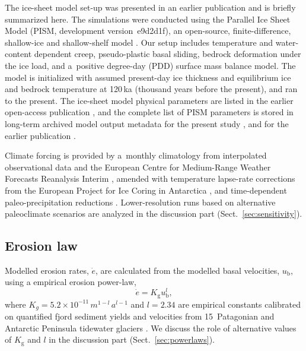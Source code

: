 \documentclass[esurf, manuscript]{copernicus}
\begin{document}
    The ice-sheet model set-up was presented in an earlier publication
    \citep{Seguinot.etal.2018} and is briefly summarized here. The simulations
    were conducted using the Parallel Ice Sheet Model (PISM, development
    version~e9d2d1f), an open-source, finite-difference, shallow-ice and
    shallow-shelf model \citep{PISM-authors.2017}. Our setup includes
    temperature and water-content dependent creep, pseudo-plastic basal
    sliding, bedrock deformation under the ice
    load, and a~positive degree-day (PDD) surface mass balance model. The model
    is initialized with assumed present-day ice thickness and equilibrium
    ice and bedrock temperature at 120\,ka (thousand years before the present),
    and ran to the present. The ice-sheet model physical parameters are listed
    in the earlier open-access publication \citep{Seguinot.etal.2018}, and the
    complete list of PISM
    parameters is stored in long-term archived model output metadata for the
    present study \citep{Seguinot.2021}, and for the earlier publication
    \citep{Seguinot.2020, Seguinot.2020a}.

    Climate forcing is provided by a~monthly climatology from interpolated
    observational data \citep[WorldClim;][]{Hijmans.etal.2005} and the European
    Centre for Medium-Range Weather Forecasts Reanalysis Interim
    \citep[ERA-Interim;][]{Dee.etal.2011}, amended with temperature lapse-rate
    corrections from the European Project for Ice Coring in Antarctica
    \citep[EPICA;][] {Jouzel.etal.2007}, and time-dependent paleo-precipitation
    reductions \citep{Huybrechts.2002}. Lower-resolution runs based on
    alternative paleoclimate scenarios \citep{Seguinot.etal.2018} are analyzed
    in the discussion part (Sect.~\ref{sec:sensitivity}).

\subsection{Erosion law}

    Modelled erosion rates, $\dot{e}$, are calculated from the modelled basal
    velocities, $u_\mathrm{b}$, using a empirical erosion power-law,
    \begin{equation}
        \dot{e} = K_\mathrm{g} u_\mathrm{b}^l ,
    \end{equation}
    where $K_g = 5.2\times 10^{-11}\,m^{1-l}\,a^{l-1}$ and $l = 2.34$ are
    empirical constants calibrated on quantified fjord sediment yields and
    velocities from 15~Patagonian and Antarctic Peninsula tidewater glaciers
    \citep{Koppes.etal.2015}. We discuss the role of alternative values of
    $K_\mathrm{g}$ and $l$ in the discussion part (Sect.~\ref{sec:powerlaws}).
\end{document}

